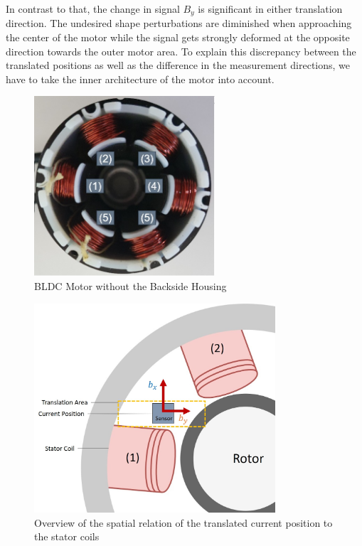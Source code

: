 \documentclass[english]{isasthesis}
\begin{document}
    		In contrast to that, the change in signal $B_y$ is significant in either translation direction. The undesired shape perturbations are diminished when approaching the center of the motor while the signal gets strongly deformed at the opposite direction towards the outer motor area. To explain this discrepancy between the translated positions as well as the difference in the measurement directions, we have to take the inner architecture of the motor into account.
    		\begin{figure}[p]
    		\begin{center}
    			\includegraphics[width=0.6\textwidth]{figures/coil_distribution.jpg}   
  			\end{center}
    		\caption{BLDC Motor without the Backside Housing}
    		\label{fig:coil distribution}
    		\end{figure}
    		\begin{figure}[p]
    		\begin{center}
    			\includegraphics[width=0.8\textwidth]{figures/Positions/original_scheme.jpg}   
  			\end{center}
    		\caption{Overview of the spatial relation of the translated current position to the stator coils}
    		\label{fig:spatial relation}
    		\end{figure}
\end{document}
